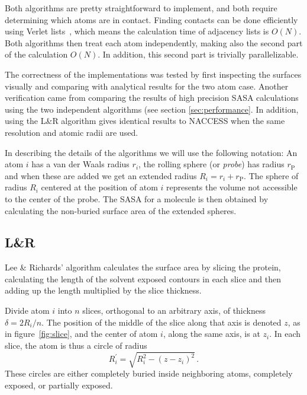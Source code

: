 \documentclass[a4paper,11pt]{article}
\begin{document}
Both algorithms are pretty straightforward to implement, and both
require determining which atoms are in contact. Finding contacts can
be done efficiently using Verlet lists~\cite{Verlet}, which means the
calculation time of adjacency lists is $O(N)$. Both algorithms then
treat each atom independently, making also the second part of the
calculation $O(N)$. In addition, this second part is trivially
parallelizable.

The correctness of the implementations was tested by first inspecting
the surfaces visually and comparing with analytical results for the
two atom case. Another verification came from comparing the results of
high precision SASA calculations using the two independent algorithms
(see section \ref{sec:performance}. In addition, using the L\&R
algorithm gives identical results to NACCESS when the same resolution
and atomic radii are used.

In describing the details of the algorithms we will use the following
notation: An atom $i$ has a van der Waals radius $r_i$, the rolling
sphere (or \emph{probe}) has radius $r_\text{P}$ and when these are
added we get an extended radius $R_i = r_i + r_\text{P}$. The sphere
of radius $R_i$ centered at the position of atom $i$ represents the
volume not accessible to the center of the probe. The SASA for a
molecule is then obtained by calculating the non-buried surface area
of the extended spheres.

\subsection{L\&R} \label{sec:alg_LnR}

Lee \& Richards' algorithm calculates the surface area by slicing the
protein, calculating the length of the solvent exposed contours in
each slice and then adding up the length multiplied by the slice
thickness. 

Divide atom $i$ into $n$ slices, orthogonal to an arbitrary axis, of
thickness $\delta = 2R_i/n$. The position of the middle of the slice
along that axis is denoted $z$, as in figure~\ref{fig:slice}, and the
center of atom $i$, along the same axis, is at $z_i$. In each slice,
the atom is thus a circle of radius
\begin{equation}R_i^\prime = \sqrt{R_i^2-(z-z_i)^2}\,.\end{equation}
These circles are either completely buried inside neighboring atoms,
completely exposed, or partially exposed.
\end{document}
